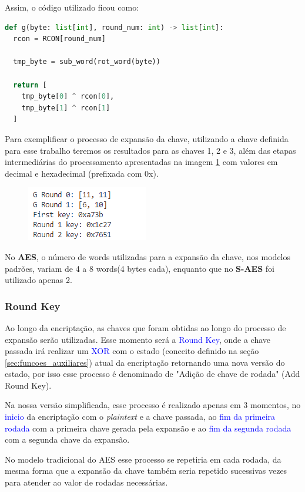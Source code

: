 \documentclass[12pt]{article}
\newcommand{\blue}[1]{\textcolor{blue}{#1}}
\begin{document}
Assim, o código utilizado ficou como:
\begin{lstlisting}[language=Python]
def g(byte: list[int], round_num: int) -> list[int]:
  rcon = RCON[round_num]

  tmp_byte = sub_word(rot_word(byte))

  return [
    tmp_byte[0] ^ rcon[0],
    tmp_byte[1] ^ rcon[1]
  ]
\end{lstlisting}

Para exemplificar o processo de expansão da chave, utilizando a chave definida para esse trabalho teremos os resultados para as chaves 1, 2 e 3, além das etapas intermediárias do processamento apresentadas na imagem \ref{fig:Key Expansion Results} com valores em decimal e hexadecimal (prefixada com 0x). 

\begin{figure}[h]
    \centering
    \includegraphics[width = 0.35\linewidth]{Imagens/Key-expansion-results.png}  
    \label{fig:Key Expansion Results}
\end{figure}

No \textbf{AES}, o número de words utilizadas para a expansão da chave, nos modelos padrões, variam de 4 a 8 words(4 bytes cada), enquanto que no \textbf{S-AES} foi utilizado apenas 2.


\subsubsection{Round Key}
Ao longo da encriptação, as chaves que foram obtidas ao longo do processo de expansão serão utilizadas. Esse momento será a \blue{Round Key}, onde a chave passada irá realizar um \blue{XOR} com o estado (conceito definido na seção \ref{sec:funcoes_auxiliares}) atual da encriptação retornando uma nova versão do estado, por isso esse processo é denominado de "Adição de chave de rodada" (Add Round Key).

Na nossa versão simplificada, esse processo é realizado apenas em 3 momentos, no \blue{inicio} da encriptação com o \textit{plaintext} e a chave passada, ao \blue{fim da primeira rodada} com a primeira chave gerada pela expansão e ao \blue{fim da segunda rodada} com a segunda chave da expansão. 

No modelo tradicional do AES esse processo se repetiria em cada rodada, da mesma forma que a expansão da chave também seria repetido sucessivas vezes para atender ao valor de rodadas necessárias. 
\end{document}
